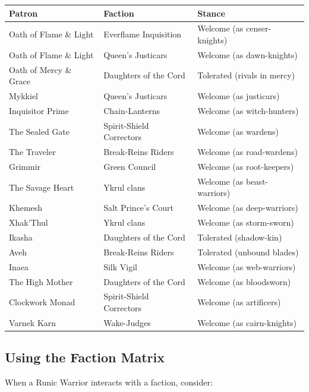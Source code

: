 \begin{table}[h]
\centering
\small
\begin{tabular}{lll}
\hline
\textbf{Patron} & \textbf{Faction} & \textbf{Stance} \\
\hline
Oath of Flame \& Light & Everflame Inquisition & Welcome (as censer-knights) \\
Oath of Flame \& Light & Queen's Justicars & Welcome (as dawn-knights) \\
Oath of Mercy \& Grace & Daughters of the Cord & Tolerated (rivals in mercy) \\
Mykkiel & Queen's Justicars & Welcome (as justicars) \\
Inquisitor Prime & Chain-Lanterns & Welcome (as witch-hunters) \\
The Sealed Gate & Spirit-Shield Correctors & Welcome (as wardens) \\
The Traveler & Break-Reins Riders & Welcome (as road-wardens) \\
Grimmir & Green Council & Welcome (as root-keepers) \\
The Savage Heart & Ykrul clans & Welcome (as beast-warriors) \\
Khemesh & Salt Prince's Court & Welcome (as deep-warriors) \\
Xhak'Thul & Ykrul clans & Welcome (as storm-sworn) \\
Ikasha & Daughters of the Cord & Tolerated (shadow-kin) \\
Aveh & Break-Reins Riders & Tolerated (unbound blades) \\
Inaea & Silk Vigil & Welcome (as web-warriors) \\
The High Mother & Daughters of the Cord & Welcome (as bloodsworn) \\
Clockwork Monad & Spirit-Shield Correctors & Welcome (as artificers) \\
Varnek Karn & Wake-Judges & Welcome (as cairn-knights) \\
\hline
\end{tabular}
\end{table}

\subsection*{Using the Faction Matrix}

When a Runic Warrior interacts with a faction, consider:

